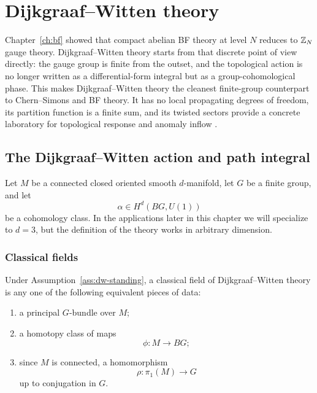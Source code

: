 \chapter{Dijkgraaf--Witten theory}\label{ch:dw}

Chapter~\ref{ch:bf} showed that compact abelian BF theory at level $N$ reduces to $\mathbb{Z}_N$ gauge theory. Dijkgraaf--Witten theory starts from that discrete point of view directly: the gauge group is finite from the outset, and the topological action is no longer written as a differential-form integral but as a group-cohomological phase. This makes Dijkgraaf--Witten theory the cleanest finite-group counterpart to Chern--Simons and BF theory. It has no local propagating degrees of freedom, its partition function is a finite sum, and its twisted sectors provide a concrete laboratory for topological response and anomaly inflow \cite{DijkgraafWitten1990}.

\section{The Dijkgraaf--Witten action and path integral}\label{sec:dw-action}

\begin{assumption}\label{ass:dw-standing}
Let $M$ be a connected closed oriented smooth $d$-manifold, let $G$ be a finite group, and let
\begin{equation*}
\alpha \in H^d(BG,U(1))
\end{equation*}
be a cohomology class. In the applications later in this chapter we will specialize to $d=3$, but the definition of the theory works in arbitrary dimension.
\end{assumption}

\subsection{Classical fields}

\begin{definition}\label{def:dw-field}
Under Assumption~\ref{ass:dw-standing}, a classical field of Dijkgraaf--Witten theory is any one of the following equivalent pieces of data:
\begin{enumerate}
\item a principal $G$-bundle over $M$;
\item a homotopy class of maps
\begin{equation*}
\phi:M\to BG;
\end{equation*}
\item since $M$ is connected, a homomorphism
\begin{equation*}
\rho:\pi_1(M)\to G
\end{equation*}
up to conjugation in $G$.
\end{enumerate}
\end{definition}

